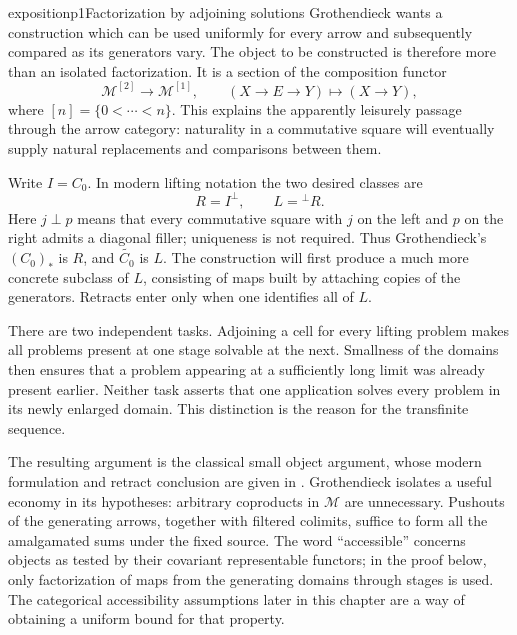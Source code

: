 \begin{dcomment}{exposition}{p1}{Factorization by adjoining solutions}
Grothendieck wants a construction which can be used uniformly for every arrow and subsequently compared as its generators vary. The object to be constructed is therefore more than an isolated factorization. It is a section of the composition functor
\[
 \mathcal M^{[2]}\longrightarrow\mathcal M^{[1]},
 \qquad (X\longrightarrow E\longrightarrow Y)\longmapsto(X\longrightarrow Y),
\]
where $[n]=\{0<\cdots<n\}$. This explains the apparently leisurely passage through the arrow category: naturality in a commutative square will eventually supply natural replacements and comparisons between them.

Write $I=C_0$. In modern lifting notation the two desired classes are
\[
 R=I^\perp,\qquad L={}^{\perp}R.
\]
Here $j\perp p$ means that every commutative square with $j$ on the left and $p$ on the right admits a diagonal filler; uniqueness is not required. Thus Grothendieck's $(C_0)_*$ is $R$, and $\widetilde{C_0}$ is $L$. The construction will first produce a much more concrete subclass of $L$, consisting of maps built by attaching copies of the generators. Retracts enter only when one identifies all of $L$.

There are two independent tasks. Adjoining a cell for every lifting problem makes all problems present at one stage solvable at the next. Smallness of the domains then ensures that a problem appearing at a sufficiently long limit was already present earlier. Neither task asserts that one application solves every problem in its newly enlarged domain. This distinction is the reason for the transfinite sequence.

The resulting argument is the classical small object argument, whose modern formulation and retract conclusion are given in \citet[Theorem~12.2.2 and Corollary~12.2.4]{Riehl2014}. Grothendieck isolates a useful economy in its hypotheses: arbitrary coproducts in $\mathcal M$ are unnecessary. Pushouts of the generating arrows, together with filtered colimits, suffice to form all the amalgamated sums under the fixed source. The word ``accessible'' concerns objects as tested by their covariant representable functors; in the proof below, only factorization of maps from the generating domains through stages is used. The categorical accessibility assumptions later in this chapter are a way of obtaining a uniform bound for that property.
\end{dcomment}

